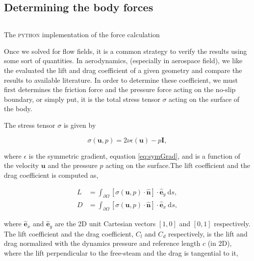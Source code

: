 \subsection{Determining the body forces}

	\begin{listing}[t]
	\inputminted[fontseries=courier,obeytabs,fontsize=\footnotesize,mathescape,linenos,numbersep=5pt,frame=lines,framesep=2mm,xleftmargin=20mm,xrightmargin=20mm]{python}{figures/eulerian/forces.py}
	\caption{The \textsc{python} implementation of the force calculation}
	\label{lst:pycode-forceCalculation}
	\end{listing}

Once we solved for flow fields, it is a common strategy to verify the results using some sort of quantities. In aerodynamics, (especially in aerospace field), we like the evaluated the lift and drag coefficient of a given geometry and compare the results to available literature. In order to determine these coefficient, we must first determines the 
friction force and the pressure force acting on the no-slip boundary, or simply put, it is the total stress tensor $\sigma$ acting on the surface of the body.

The stress tensor $\sigma$ is given by

	\begin{equation}
	\sigma(\mathbf{u},p) = 2\nu\epsilon(\mathbf{u}) - p\mathbf{I},
	\end{equation}

where $\epsilon$ is the symmetric gradient, equation \ref{eq:symGrad}, and is a function of the velocity $\mathbf{u}$ and the pressure $p$ acting on the surface.The lift coefficient and the drag coefficient is computed as,

	\begin{subequations}
	\begin{align}
	L &= \int_{\partial \Omega} \left[\sigma(\mathbf{u},p) \cdot \hat{\mathbf{n}}\right]\cdot \hat{\mathbf{e}}_y\ \mathrm{d}s,\\
	D &= \int_{\partial \Omega} \left[\sigma(\mathbf{u},p) \cdot \hat{\mathbf{n}}\right]\cdot \hat{\mathbf{e}}_x\ \mathrm{d}s,
	\end{align}
	\end{subequations}

where $\hat{\mathbf{e}}_x$ and $\hat{\mathbf{e}}_y$ are the 2D unit Cartesian vectors $[1,0]$ and $[0,1]$ respectively. The lift coefficient and the drag coefficient, $C_l$ and $C_d$ respectively, is the lift and drag normalized with the dynamics pressure and reference length $c$ (in 2D), where the lift perpendicular to the free-steam and the drag is tangential to it,

